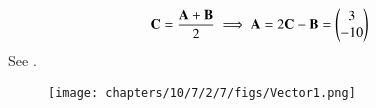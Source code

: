 	\begin{align}
	\mathbf{C} = \frac{\mathbf{A+B}}{2} 
	\implies 	\mathbf{A} = 2\mathbf{C}-\mathbf{B} 
	 = \begin{pmatrix}3\\-10\\\end{pmatrix}	
	\end{align}       
	See 
.
\begin{figure}[H]
\begin{center}	
	\texttt{[image: chapters/10/7/2/7/figs/Vector1.png]}
\end{center}
\caption{}
\label{fig:chapters/10/7/2/7Fig}
\end{figure}
	
